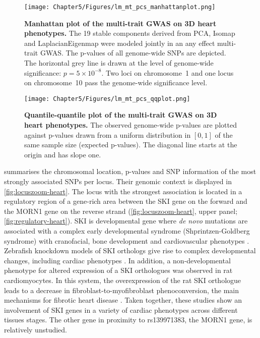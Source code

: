 \begin{figure}[hbtp]
	\centering
	\texttt{[image: Chapter5/Figures/lm\_mt\_pcs\_manhattanplot.png]}
	\caption[\textbf{Manhattan plot of the multi-trait GWAS on 3D heart phenotypes .}]{\textbf{Manhattan plot of the multi-trait GWAS on 3D heart phenotypes. }The \num{19} stable components derived from PCA, Isomap and LaplacianEigenmap were modeled jointly in an any effect multi-trait GWAS. The p-values of all genome-wide SNPs are depicted. The horizontal grey line is drawn at the level of genome-wide significance: \(p = 5 \times 10^{-8}\). Two loci on chromosome~1 and one locus on chromosome~10 pass the genome-wide significance level.} 
	 	\label{fig:manhattan-heart}
\end{figure}
%
\begin{figure}[hbtp]
	\centering
	\texttt{[image: Chapter5/Figures/lm\_mt\_pcs\_qqplot.png]}
	\caption[\textbf{Quantile-quantile plot of the multi-trait GWAS on 3D heart phenotypes .}]{\textbf{Quantile-quantile plot of the multi-trait GWAS on 3D heart phenotypes. } The observed genome-wide p-values are plotted against p-values drawn from a uniform distribution in \([0,1]\) of the same sample size (expected p-values). The diagonal line starts at the origin and has slope one.} 
	 	\label{fig:qq-heart}
\end{figure}
%
 summarises the chromosomal location, p-values and SNP information of the most strongly associated SNPs per locus. Their genomic context is displayed in \cref{fig:locuszoom-heart}. The locus with the strongest association is located in a regulatory region of a gene-rich area between the SKI gene on the forward and the MORN1 gene on the reverse strand (\cref{fig:locuszoom-heart}, upper panel; \cref{fig:regulatory-heart}). SKI is developmental gene where \textit{de novo} mutations are associated with a complex early developmental syndrome (Shprintzen-Goldberg syndrome) with cranofacial, bone development and cardiovascular phenotypes \citep{Greally1993}. Zebrafish knockdown models of SKI orthologs give rise to complex developmental changes, including cardiac phenotypes \citep{Doyle2012}. In addition, a non-developmental phenotype for altered expression of a SKI orthologues was observed in rat cardiomyocytes. In this system, the overexpression of the rat SKI orthologue leads to a decrease in fibroblast-to-myofibroblast phenoconversion, the main mechanisms for fibrotic heart disease \citep{Cunnington2010,Cunnington2014,Zeglinski2016}. Taken together, these studies show an involvement of SKI genes in a variety of cardiac phenotypes across different tissues stages. The other gene in proximity to rs139971383, the MORN1 gene, is relatively unstudied. 

